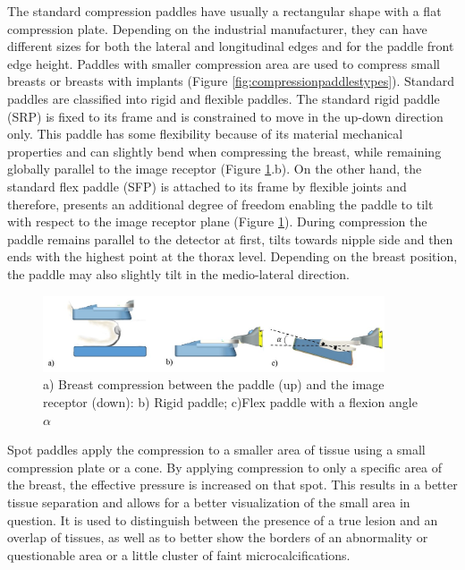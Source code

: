  The standard compression paddles have usually a rectangular shape with a flat compression plate. Depending on the industrial manufacturer, they can have different sizes for both the lateral and longitudinal edges and for the paddle front edge height. Paddles with smaller compression area are used to compress small breasts or breasts with implants (Figure \ref{fig:compressionpaddlestypes}). Standard paddles are classified into rigid and flexible paddles. The standard rigid paddle (SRP) is fixed to its frame and is constrained to move in the up-down direction only. This paddle has some flexibility because of its material mechanical properties and can slightly bend when compressing the breast, while remaining globally parallel to the image receptor (Figure \ref{fig:compressionpaddles}.b). On the other hand, the standard flex paddle (SFP)  is attached to its frame by flexible joints and therefore, presents an additional degree of freedom enabling the paddle to tilt with respect to the image receptor plane (Figure \ref{fig:compressionpaddles}). During compression the paddle remains parallel to the detector at first, tilts towards nipple side and then ends with the highest point at the thorax level. Depending on the breast position, the paddle may also slightly tilt in the medio-lateral direction.

\begin{figure}[!h]
\centering
\includegraphics[width=0.9\textwidth,keepaspectratio]{figures/compressionpaddles.jpg} 
\caption{a) Breast compression between the paddle (up) and the image receptor (down): b) Rigid paddle; c)Flex paddle with a flexion angle $\alpha$}\label{fig:compressionpaddles}
\end{figure}


 Spot paddles apply the compression to a smaller area of tissue using a small compression plate or a cone. By applying compression to only a specific area of the breast, the effective pressure is increased on that spot. This results in a better tissue separation and allows for a better visualization of the small area in question.  It is used to distinguish between the presence of a true lesion and an overlap of tissues, as well as to better show the borders of an abnormality or questionable area or a little cluster of faint microcalcifications.  

